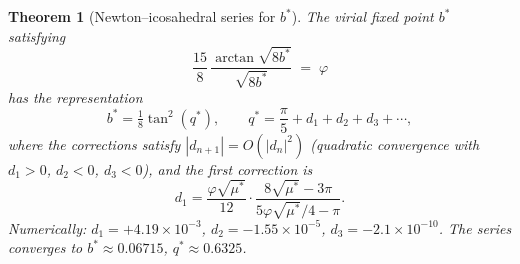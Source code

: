 \documentclass[11pt,a4paper]{article}
\newtheorem{theorem}{Theorem}[section]
\theoremstyle{definition}
\theoremstyle{remark}
\newcommand{\vp}{\varphi}
\newcommand{\ms}{\mu^{*}}
\begin{document}
\begin{theorem}[Newton--icosahedral series for $b^*$]
\label{P12:thm:C}
The virial fixed point $b^*$ satisfying
\begin{equation}
  \frac{15}{8}\,\frac{\arctan\sqrt{8b^*}}{\sqrt{8b^*}} \;=\; \vp
  \label{P12:eq:virial_cond}
\end{equation}
has the representation
\begin{equation}
  \boxed{
  b^* = \tfrac{1}{8}\tan^2(q^*),\qquad
  q^* = \frac{\pi}{5}+d_1+d_2+d_3+\cdots,
  }
  \label{P12:eq:bstar}
\end{equation}
where the corrections satisfy $|d_{n+1}|=O(|d_n|^2)$
(quadratic convergence with $d_1>0$, $d_2<0$, $d_3<0$), and the first correction is
\begin{equation}
  d_1 = \frac{\vp\sqrt{\ms}}{12}\cdot
  \frac{8\sqrt{\ms}-3\pi}{5\vp\sqrt{\ms}/4-\pi}.
  \label{P12:eq:d1}
\end{equation}
Numerically: $d_1=+4.19\times10^{-3}$,
$d_2=-1.55\times10^{-5}$,
$d_3=-2.1\times10^{-10}$.
The series converges to $b^*\approx0.06715$, $q^*\approx0.6325$.
\end{theorem}
\end{document}
